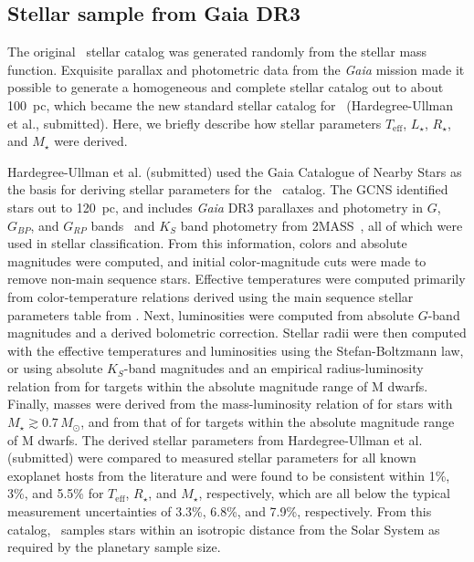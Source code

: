 \documentclass[twocolumn]{aastex631}
\begin{document}
\subsection{Stellar sample from Gaia DR3}
The original \bioverse\ stellar catalog was generated randomly from the \citet{Chabrier2003} stellar mass function. Exquisite parallax and photometric data from the \textit{Gaia} mission made it possible to generate a homogeneous and complete stellar catalog out to about 100~pc, which became the new standard stellar catalog for \bioverse ~(Hardegree-Ullman et al., submitted). Here, we briefly describe how stellar parameters $T_{\mathrm{eff}}$, $L_{\star}$, $R_{\star}$, and $M_{\star}$ were derived.

Hardegree-Ullman et al. (submitted) used the Gaia Catalogue of Nearby Stars \citep[hereafter GCNS,][]{Smart2021} as the basis for deriving stellar parameters for the \bioverse\ catalog.
The GCNS identified stars out to 120~pc, and includes \textit{Gaia} DR3 parallaxes and photometry in $G$, $G_{BP}$, and $G_{RP}$ bands~\citep{GaiaCollaboration2021} and $K_S$ band photometry from 2MASS~\citep{Cutri2003}, all of which were used in stellar classification.
From this information, colors and absolute magnitudes were computed, and initial color-magnitude cuts were made to remove non-main sequence stars.
Effective temperatures were computed primarily from color-temperature relations derived using the main sequence stellar parameters table from \citet{Pecaut2013}.
Next, luminosities were computed from absolute $G$-band magnitudes and a derived bolometric correction.
Stellar radii were then computed with the effective temperatures and luminosities using the Stefan-Boltzmann law, or using absolute $K_S$-band magnitudes and an empirical radius-luminosity relation from \citet{Mann2015} for targets within the absolute magnitude range of M dwarfs.
Finally, masses were derived from the mass-luminosity relation of \citet{Torres2010} for stars with $M_{\star}\gtrsim 0.7\,M_{\odot}$, and from that of \citet{Mann2019} for targets within the absolute magnitude range of M dwarfs.
The derived stellar parameters from Hardegree-Ullman et al. (submitted) were compared to measured stellar parameters for all known exoplanet hosts from the literature and were found to be consistent within 1\%, 3\%, and 5.5\% for $T_{\mathrm{eff}}$, $R_{\star}$, and $M_{\star}$, respectively, which are all below the typical measurement uncertainties of 3.3\%, 6.8\%, and 7.9\%, respectively.
From this catalog, \bioverse\ samples stars within an isotropic distance from the Solar System as required by the planetary sample size.
\end{document}
